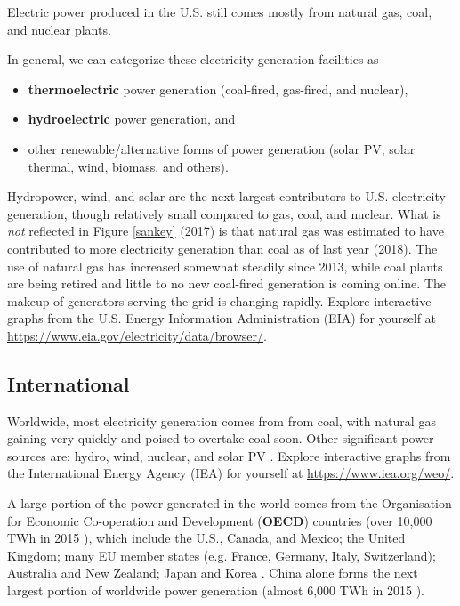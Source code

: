 \documentclass[10pt]{article}
\begin{document}
\smallskip

Electric power produced in the U.S. still comes mostly from natural gas, coal, and nuclear plants. 

In general, we can categorize these electricity generation facilities as

\begin{itemize}
    \item \textbf{thermoelectric} power generation (coal-fired, gas-fired, and nuclear),
    \item \textbf{hydroelectric} power generation, and
    \item other renewable/alternative forms of power generation (solar PV, solar thermal, wind, biomass, and others).
\end{itemize}

Hydropower, wind, and solar are the next largest contributors to U.S. electricity generation, though relatively small compared to gas, coal, and nuclear. What is \textit{not} reflected in Figure \ref{sankey} (2017) is that natural gas was estimated to have contributed to more electricity generation than coal as of last year (2018). The use of natural gas has increased somewhat steadily since 2013, while coal plants are being retired and little to no new coal-fired generation is coming online. The makeup of generators serving the grid is changing rapidly. Explore interactive graphs from the U.S. Energy Information Administration (EIA) for yourself at \url{https://www.eia.gov/electricity/data/browser/}.

\subsection{International}

Worldwide, most electricity generation comes from from coal, with natural gas gaining very quickly and poised to overtake coal soon. Other significant power sources are: hydro, wind, nuclear, and solar PV \cite{noauthor_undated-ge}. Explore interactive graphs from the International Energy Agency (IEA) for yourself at \url{https://www.iea.org/weo/}.

A large portion of the power generated in the world comes from the Organisation for Economic Co-operation and Development (\textbf{OECD}) countries (over 10,000 TWh in 2015 \cite{noauthor_undated-gz}), which include the U.S., Canada, and Mexico; the United Kingdom; many EU member states (e.g.  France, Germany, Italy, Switzerland); Australia and New Zealand; Japan and Korea \cite{noauthor_undated-yg}. China alone forms the next largest portion of worldwide power generation (almost 6,000 TWh in 2015 \cite{noauthor_undated-gz}).
\end{document}
